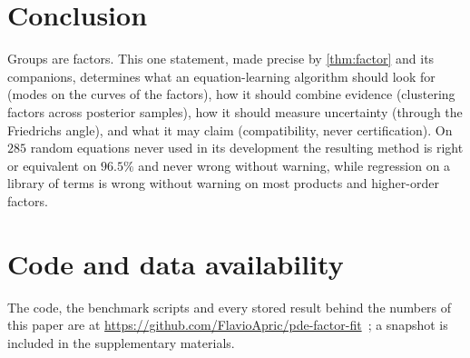 \section{Conclusion}\label{sec:conclusion}
Groups are factors. This one statement, made precise by \cref{thm:factor} and its companions, determines what an
equation-learning algorithm should look for (modes on the curves of the factors), how it should combine evidence
(clustering factors across posterior samples), how it should measure uncertainty (through the Friedrichs angle), and
what it may claim (compatibility, never certification). On $285$ random equations never used in its development the
resulting method is right or equivalent on $96.5\%$ and never wrong without warning, while regression on a library of
terms is wrong without warning on most products and higher-order factors.

\section*{Code and data availability}
The code, the benchmark scripts and every stored result behind the numbers of this paper are at
\url{https://github.com/FlavioApric/pde-factor-fit}~\cite{Pri26code}; a snapshot is included in the supplementary
materials.

